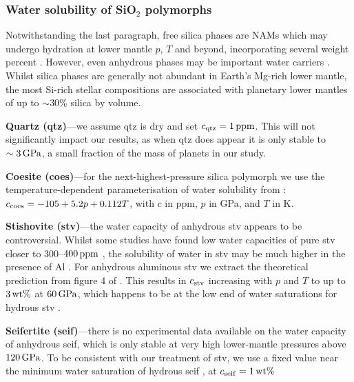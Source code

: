 \documentclass[fleqn,usenatbib]{mnras}
\begin{document}
\subsubsection{Water solubility of SiO$_2$ polymorphs}\label{sec:methods_sio2}

Notwithstanding the last paragraph, free silica phases are NAMs which may undergo hydration at lower mantle $p$, $T$ and beyond, incorporating several weight percent  \citep{nisr_large_2020}. However, even anhydrous  phases may be important water carriers \citep{panero_hydrogen_2004, litasov_high_2007}. Whilst silica phases are generally not abundant in Earth's Mg-rich lower mantle, the most Si-rich stellar compositions are associated with planetary lower mantles of up to $\sim$30\% silica by volume. %

\textbf{Quartz (qtz)}---we assume qtz is dry and set $c_{\rm qtz} = 1\,{\rm ppm}$. This will not significantly impact our results, as when qtz does appear it is only stable to $\sim3\,{\rm GPa}$, a small fraction of the mass of planets in our study.

\textbf{Coesite (coes)}---for the next-highest-pressure silica polymorph we use the temperature-dependent parameterisation of water solubility from \citet{yan_water_2021}: $c_{\rm coes} = -105 + 5.2 p + 0.112 T$, with $c$ in ppm, $p$ in GPa, and $T$ in K.

\textbf{Stishovite (stv)}---the water capacity of anhydrous stv appears to be controversial. Whilst some studies have found low water capacities of pure stv closer to 300--$400\,{\rm ppm}$ \citep{liu_bridgmanite_2021}, the solubility of water in stv may be much higher in the presence of Al \citep{litasov_high_2007}. For anhydrous aluminous stv we extract the theoretical prediction from figure 4 of \citet{panero_hydrogen_2004}. This results in $c_{\rm stv}$ increasing with $p$ and $T$ to up to $3\,{\rm wt\%}$ at $60\,{\rm GPa}$, which happens to be at the low end of water saturations for hydrous stv \citep{lin_evidence_2020}. 

\textbf{Seifertite (seif)}---there is no experimental data available on the water capacity of anhydrous seif, which is only stable at very high lower-mantle pressures above $120\,{\rm GPa}$. To be consistent with our treatment of stv, we use a fixed value near the minimum water saturation of hydrous seif \citep{lin_hydrous_2022}, at $c_{\rm seif} = 1\,{\rm wt\%}$
\end{document}
